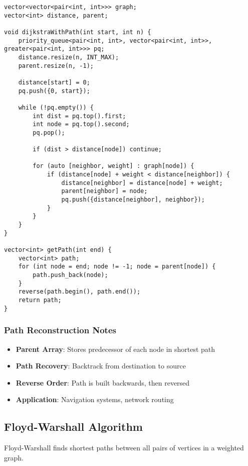 \documentclass[11pt,a4paper]{article}
\begin{document}
\newpage
\begin{lstlisting}[caption={Dijkstra with Path Reconstruction}]
vector<vector<pair<int, int>>> graph;
vector<int> distance, parent;

void dijkstraWithPath(int start, int n) {
    priority_queue<pair<int, int>, vector<pair<int, int>>, greater<pair<int, int>>> pq;
    distance.resize(n, INT_MAX);
    parent.resize(n, -1);
    
    distance[start] = 0;
    pq.push({0, start});
    
    while (!pq.empty()) {
        int dist = pq.top().first;
        int node = pq.top().second;
        pq.pop();
        
        if (dist > distance[node]) continue;
        
        for (auto [neighbor, weight] : graph[node]) {
            if (distance[node] + weight < distance[neighbor]) {
                distance[neighbor] = distance[node] + weight;
                parent[neighbor] = node;
                pq.push({distance[neighbor], neighbor});
            }
        }
    }
}

vector<int> getPath(int end) {
    vector<int> path;
    for (int node = end; node != -1; node = parent[node]) {
        path.push_back(node);
    }
    reverse(path.begin(), path.end());
    return path;
}
\end{lstlisting}

\subsubsection{Path Reconstruction Notes}
\begin{itemize}
\item \textbf{Parent Array}: Stores predecessor of each node in shortest path
\item \textbf{Path Recovery}: Backtrack from destination to source
\item \textbf{Reverse Order}: Path is built backwards, then reversed
\item \textbf{Application}: Navigation systems, network routing
\end{itemize}

\newpage

\subsection{Floyd-Warshall Algorithm}
Floyd-Warshall finds shortest paths between all pairs of vertices in a weighted graph.
\end{document}
